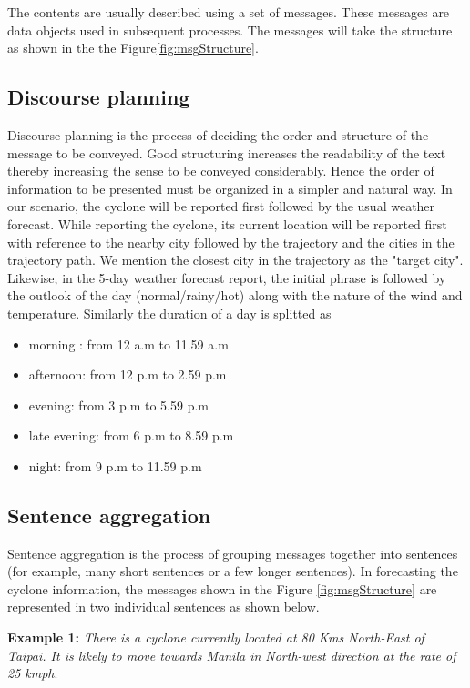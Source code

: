 \documentclass{article}
\begin{document}
The contents are usually described using a set of messages. These messages are data objects used in subsequent processes. The messages will take the structure as shown in the the Figure\ref{fig:msgStructure}.


\subsection{Discourse planning}
\label{ssec:discourse Planning}

Discourse planning is the process of deciding the order and structure of the message to be conveyed. Good structuring increases the readability of the text thereby increasing the sense to be conveyed considerably. Hence the order of information to be presented must be organized in a simpler and natural way. In our scenario, the cyclone will be reported first followed by the usual weather forecast. While reporting the cyclone, its current location will be reported first with reference to the nearby city followed by the trajectory and the cities in the trajectory path. We mention the closest city in the trajectory as the "target city".  Likewise, in the 5-day weather forecast report, the initial phrase is followed by the outlook of the day (normal/rainy/hot) along with the nature of the wind and temperature. Similarly the duration of a day is splitted as
\begin{itemize}
\item morning : from 12 a.m to 11.59 a.m
\item afternoon: from 12 p.m to 2.59 p.m
\item evening: from 3 p.m to 5.59 p.m
\item late evening: from 6 p.m to 8.59 p.m
\item night: from 9 p.m to 11.59 p.m
\end{itemize} 


\subsection{Sentence aggregation}
\label{ssec:aggragation}
Sentence aggregation is the process of grouping messages together into sentences (for example, many short sentences or a few longer sentences). In forecasting the cyclone information, the messages shown in the Figure \ref{fig:msgStructure} are represented in two individual sentences as shown below.

{\textbf{Example 1:} \textit{There is a cyclone currently located  at 80 Kms North-East of Taipai. It is likely to move towards Manila in North-west direction at the rate of 25 kmph}}.
\end{document}
